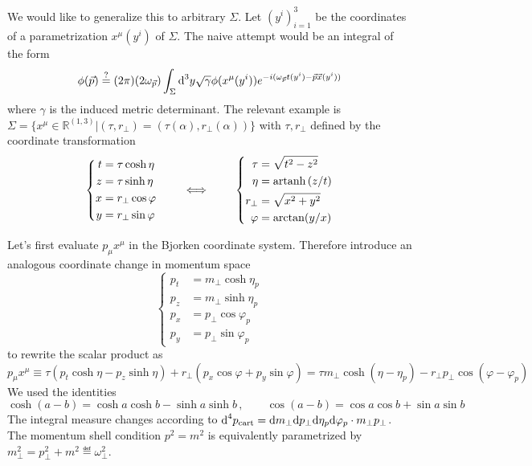 We would like to generalize this to arbitrary $\Sigma$. Let $(y^i)_{i=1}^3$ be the coordinates of a parametrization $x^\mu(y^i)$ of $\Sigma$. The naive attempt would be an integral of the form
\begin{equation}
    \phi(\vec{p})\overset{?}{=}(2\pi)(2\omega_{\vec{p}})\int_\Sigma\text{d}^3y\sqrt{\gamma}\phi(x^\mu(y^i))e^{-{i}(\omega_{\vec{p}}t(y^i)-\vec{p}\vec{x}(y^i))}
\end{equation}
where $\gamma$ is the induced metric determinant. The relevant example is $\Sigma=\{x^\mu\in\mathbb{R}^{(1,3)}\vert (\tau,r_\perp)=(\tau(\alpha),r_\perp(\alpha))\}$ with $\tau,r_\perp$ defined by the coordinate transformation
\begin{equation}
    \left\{\begin{split}
        t&=\tau\cosh\eta\\
        z&=\tau\sinh\eta\\
        x&=r_\perp\cos\varphi\\
        y&=r_\perp\sin\varphi
    \end{split}\right.
    \qquad\iff\qquad
    \left\{\begin{split}
        \tau&=\sqrt{t^2-z^2}\\
        \eta&={\text{artanh}\,}(z/t)\\
        r_\perp&=\sqrt{x^2+y^2}\\
        \varphi&=\arctan(y/x)
    \end{split}\right.
\end{equation}

Let's first evaluate $p_\mu x^\mu$ in the Bjorken coordinate system. Therefore introduce an analogous coordinate change in momentum space
\begin{equation}
    \left\{\begin{split}
        p_t&=m_\perp\cosh\eta_p\\
        p_z&=m_\perp\sinh\eta_p\\
        p_x&=p_\perp\cos\varphi_p\\
        p_y&=p_\perp\sin\varphi_p
    \end{split}\right.
\end{equation}
to rewrite the scalar product as
\begin{equation}
    p_\mu x^\mu\equiv\tau(p_t\cosh\eta-p_z\sinh\eta)+r_\perp(p_x\cos\varphi+p_y\sin\varphi)=\tau m_\perp\cosh(\eta-\eta_p)-r_\perp p_\perp\cos(\varphi-\varphi_p)
\end{equation}
We used the identities
\begin{equation}
    \cosh(a-b)=\cosh a\cosh b-\sinh a\sinh b\,,\qquad\cos(a-b)=\cos a\cos b+\sin a\sin b
\end{equation}
The integral measure changes according to $\text{d}^4p_{\text{cart}}=\text{d} m_\perp\text{d} p_\perp\text{d}\eta_p\text{d}\varphi_p\cdot m_\perp p_\perp$. The momentum shell condition $p^2=m^2$ is equivalently parametrized by $m_\perp^2=p_\perp^2+m^2\eqdef \omega_\perp^2$.

